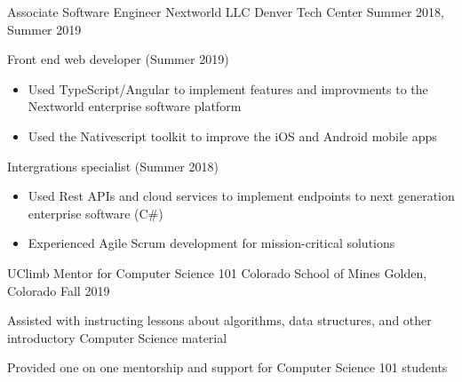 \vspace{-2.0mm}

\begin{cventries}

  \cventry
    {Associate Software Engineer} %
    {Nextworld LLC} %
    {Denver Tech Center} %
    {Summer 2018, Summer 2019} %
    {
      \begin{cvitems} %
      \item {Front end web developer (Summer 2019)}
      \begin{itemize}
            \item {Used TypeScript/Angular to implement features and
    improvments to the Nextworld enterprise software platform}
        \item {Used the Nativescript toolkit to improve the iOS and
    Android mobile apps}
    \end{itemize}
        \item {Intergrations specialist (Summer 2018)}
        \begin{itemize}
                \item {Used Rest APIs and cloud services to implement
                            endpoints to next generation enterprise software (C\#)}
                                    \item {Experienced Agile Scrum
    development for mission-critical solutions}
    \end{itemize}
      \end{cvitems}
    }

    \cventry
    	{UClimb Mentor for Computer Science 101}
    	{ Colorado School of Mines }
    	{ Golden, Colorado}
	   	 {Fall 2019  }
   	 {
   	 \begin{cvitems}
   	 \item {Assisted with instructing lessons about algorithms, data structures, and other introductory Computer Science material}
   	 \item {Provided one on one mentorship and support for Computer Science 101 students}
    \end{cvitems}
    }


\end{cventries}
